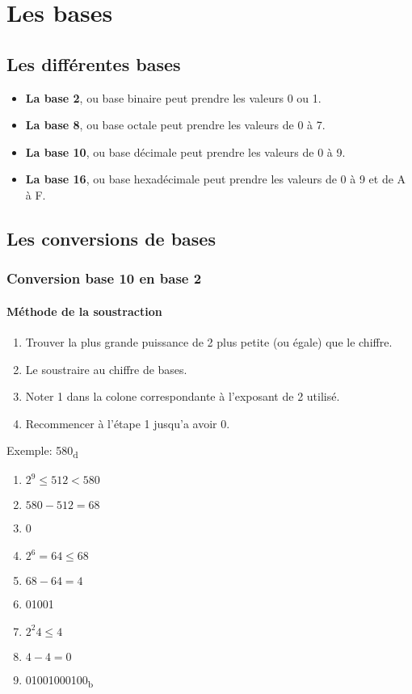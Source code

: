  \section{Les bases}
 \subsection{Les différentes bases}
 \begin{itemize}
	 \item \textbf{La base 2}, ou base binaire peut prendre les valeurs 0 ou 1.
	 \item \textbf{La base 8}, ou base octale peut prendre les valeurs de 0 à 7.
	 \item \textbf{La base 10}, ou base décimale peut prendre les valeurs de 0 à 9.
	 \item \textbf{La base 16}, ou base hexadécimale peut prendre les valeurs de 0 à 9 et de A à F.
 \end{itemize}

 \subsection{Les conversions de bases}
 \subsubsection{Conversion base 10 en base 2}
 \paragraph{Méthode de la soustraction}
 \begin{enumerate}
	 \item Trouver la plus grande puissance de 2 plus petite (ou égale) que le chiffre.
	 \item Le soustraire au chiffre de bases.
	 \item Noter 1 dans la colone correspondante à l'exposant de 2 utilisé.
	 \item Recommencer à l'étape 1 jusqu'a avoir 0.
 \end{enumerate}
 Exemple: 580\textsubscript{d}
 \begin{enumerate}
	 \item $2^9 \leq 512 < 580$
	 \item $580 - 512 = 68$
	 \item 0
	 \item $2^6 = 64 \leq 68$
	 \item $68 - 64 = 4$
	 \item 01001
	 \item $2^2 4 \leq 4$
	 \item $4 - 4 = 0$
	 \item 01001000100\textsubscript{b}
 \end{enumerate}
